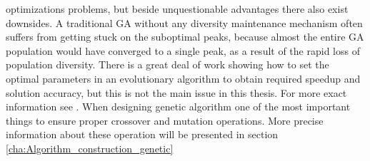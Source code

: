 optimizations problems, but beside unquestionable advantages there also exist downsides. 
A traditional GA without any diversity maintenance mechanism often suffers from getting 
stuck on the suboptimal peaks, because almost the entire GA population would have converged 
to a single peak, as a result of the rapid loss of population diversity. 
There is a great deal of work showing how to set the optimal parameters in an evolutionary 
algorithm to obtain required speedup and solution accuracy, but this is not the main issue 
in this thesis. For more exact information see .
When designing genetic algorithm one of the most important things to ensure proper crossover 
and mutation operations. More precise information about these operation will be
presented in section \ref{cha:Algorithm_construction_genetic}
